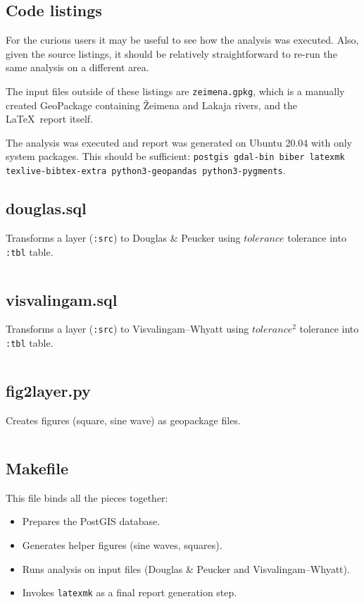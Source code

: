 \documentclass[a4paper]{article}
\newcommand{\DP}{Douglas \& Peucker}
\newcommand{\VW}{Visvalingam--Whyatt}
\begin{document}
\begin{appendices}
\section{Code listings}

For the curious users it may be useful to see how the analysis was executed.
Also, given the source listings, it should be relatively straightforward to
re-run the same analysis on a different area.

The input files outside of these listings are {\tt zeimena.gpkg}, which is a
manually created GeoPackage containing Žeimena and Lakaja rivers, and the
\LaTeX\ report itself.

The analysis was executed and report was generated on Ubuntu 20.04 with only
system packages. This should be sufficient: {\tt postgis gdal-bin biber
latexmk texlive-bibtex-extra python3-geopandas python3-pygments}.

\subsection{douglas.sql}
Transforms a layer ({\tt :src}) to {\DP} using $tolerance$ tolerance into
{\tt :tbl} table.
\inputminted[fontsize=\small]{sql}{douglas.sql}

\subsection{visvalingam.sql}
Transforms a layer ({\tt :src}) to {\VW} using $tolerance^2$ tolerance into
{\tt :tbl} table.
\inputminted[fontsize=\small]{sql}{visvalingam.sql}

\subsection{fig2layer.py}
Creates figures (square, sine wave) as geopackage files.
\inputminted[fontsize=\small]{python}{fig2layer.py}

\subsection{Makefile}
This file binds all the pieces together:
\begin{itemize}
    \item Prepares the PostGIS database.
    \item Generates helper figures (sine waves, squares).
    \item Runs analysis on input files ({\DP} and {\VW}).
    \item Invokes {\tt latexmk} as a final report generation step.
\end{itemize}
\inputminted[fontsize=\small]{make}{Makefile}


\end{appendices}
\end{document}
